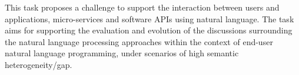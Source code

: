 This task proposes a challenge to support the interaction between users and applications, micro-services and software APIs using natural language. The task aims for supporting the evaluation and evolution of the discussions surrounding the natural language processing approaches within the context of end-user natural language programming, under scenarios of high semantic heterogeneity/gap.

